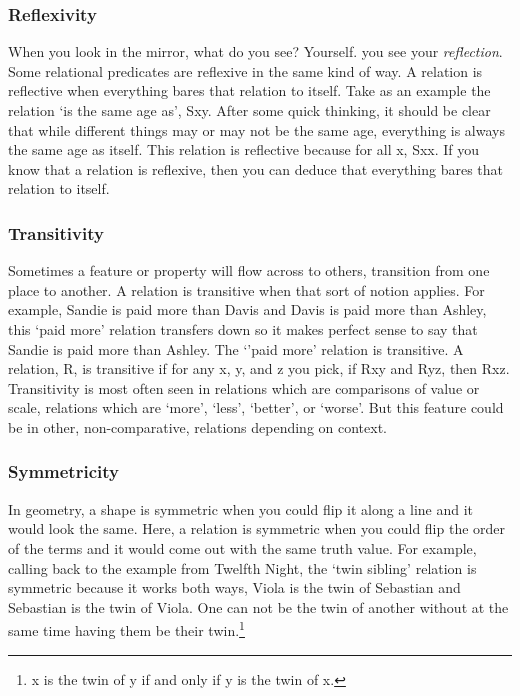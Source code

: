 \subsubsection{Reflexivity}\label{sss.reflexive}

When you look in the mirror, what do you see? Yourself. you see your \emph{reflection}. Some relational predicates are \gls{reflexive} in the same kind of way. A relation is reflective when everything bares that relation to itself. Take as an example the relation `is the same age as', Sxy. After some quick thinking, it should be clear that while different things may or may not be the same age, everything is always the same age as itself. This relation is reflective because for all x, Sxx. If you know that a relation is reflexive, then you can deduce that everything bares that relation to itself. 

\subsubsection{Transitivity}\label{sss.transitive}

Sometimes a feature or property will flow across to others, transition from one place to another. A relation is \gls{transitive} when that sort of notion applies. For example, Sandie is paid more than Davis and Davis is paid more than Ashley, this `paid more' relation transfers down so it makes perfect sense to say that Sandie is paid more than Ashley. The `'paid more'  relation is transitive. A relation, R, is transitive if for any x, y, and z you pick, if Rxy and Ryz, then Rxz. Transitivity is most often seen in relations which are comparisons of value or scale, relations which are `more', `less', `better', or `worse'. But this feature could be in other, non-comparative, relations depending on context.   

\subsubsection{Symmetricity}\label{sss.symmetric}

In geometry, a shape is symmetric when you could flip it along a line and it would look the same. Here, a relation is \gls{symmetric} when you could flip the order of the terms and it would come out with the same truth value. For example, calling back to the example from Twelfth Night, the `twin sibling' relation is symmetric because it works both ways, Viola is the twin of Sebastian and Sebastian is the twin of Viola. One can not be the twin of another without at the same time having them be their twin.\footnote{x is the twin of y if and only if y is the twin of x.} 

